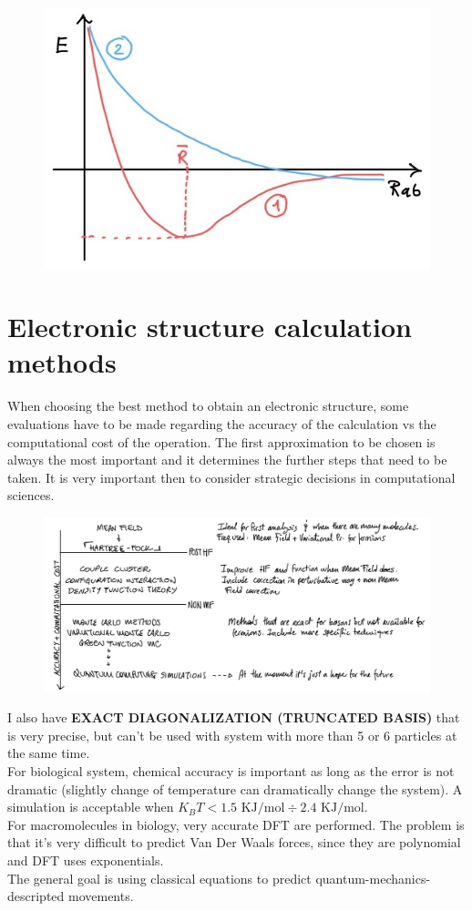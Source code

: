 \begin{figure}[htbp!]
	\centering
	\includegraphics[scale=0.30]{img_9}
\end{figure}
\section{Electronic structure calculation methods}
When choosing the best method to obtain an electronic structure, some evaluations have to be made regarding the accuracy of the calculation vs the computational cost of the operation. The first approximation to be chosen is always the most important and it determines the further steps that need to be taken. It is very important then to consider strategic decisions in computational sciences.\\
\begin{figure}[htbp!]
	\centering
	\includegraphics[scale=0.30]{img_13}
\end{figure}
\newline
I also have \textbf{EXACT DIAGONALIZATION (TRUNCATED BASIS)} that is very precise, but can't be used with system with more than 5 or 6 particles at the same time.\\
For biological system, chemical accuracy is important as long as the error is not dramatic (slightly change of temperature can dramatically change the system). A simulation is acceptable when $K_BT < 1.5\text{ KJ/mol} \div 2.4 \text{ KJ/mol}$.\\
For macromolecules in biology, very accurate DFT are performed. The problem is that it's very difficult to predict Van Der Waals forces, since they are polynomial and DFT uses exponentials.\\
The general goal is using classical equations to predict quantum-mechanics-descripted movements.\\
